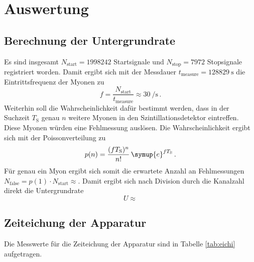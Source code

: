 \section{Auswertung}
\label{sec:Auswertung}

\subsection{Berechnung der Untergrundrate}
Es sind insgesamt $N_\text{start}=1998242$ Startsignale und 
$N_\text{stop}=7972$ Stopsignale registriert worden.
Damit ergibt sich mit der Messdauer $t_\text{measure}=\SI{128829}{\second}$
die Eintrittsfrequenz der Myonen zu
\begin{equation*}
	f = \frac{N_\text{start}}{t_\text{measure}} \approx \SI{30}{\per\second} \, \text{.}
\end{equation*}
Weiterhin soll die Wahrscheinlichkeit dafür bestimmt werden, dass in der 
Suchzeit $T_\text{S}$ genau $n$ weitere Myonen in den Szintillationsdetektor
eintreffen. Diese Myonen würden eine Fehlmessung auslösen. Die Wahrscheinlichkeit ergibt sich mit der Poissonverteilung zu
\begin{equation*}
	p(n)=\frac{(f T_\text{S})^n}{n!} \, \symup{e}^{f T_\text{S}} \, \text{.}
\end{equation*}
Für genau ein Myon ergibt sich somit die erwartete Anzahl an Fehlmessungen 
$N_\text{false}=p(1) \cdot N_\text{start} \approx $. Damit ergibt sich
nach Division durch die Kanalzahl direkt die Untergrundrate 
\begin{equation*}
	U \approx 
\end{equation*}

\subsection{Zeiteichung der Apparatur}
Die Messwerte für die Zeiteichung der Apparatur sind in Tabelle
\ref{tab:eichi} aufgetragen. 


%
